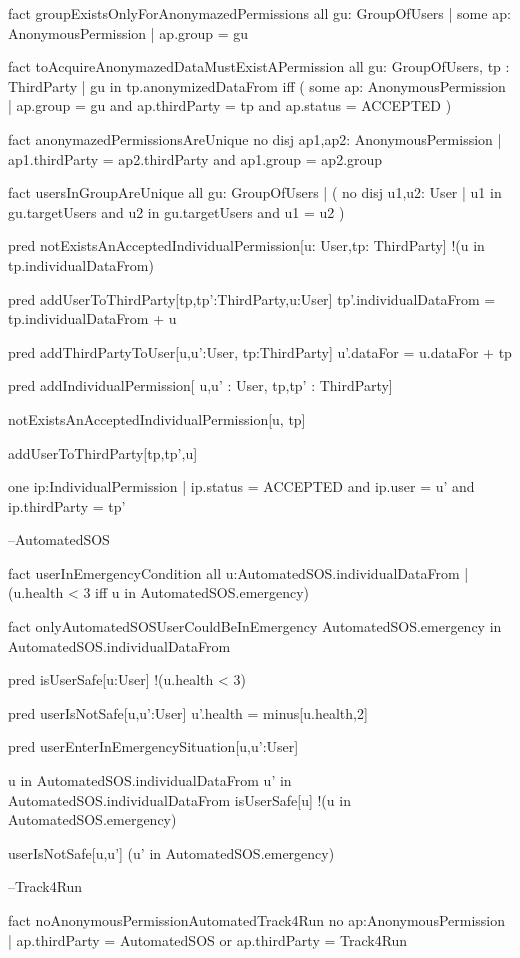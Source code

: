 \documentclass[a4paper]{article}
\begin{document}
{fact groupExistsOnlyForAnonymazedPermissions {
all gu: GroupOfUsers | some ap: AnonymousPermission | ap.group = gu
}

fact toAcquireAnonymazedDataMustExistAPermission{
all gu: GroupOfUsers, tp : ThirdParty |  gu in tp.anonymizedDataFrom iff ( some ap: AnonymousPermission | ap.group = gu and ap.thirdParty = tp and ap.status = ACCEPTED )
}

fact anonymazedPermissionsAreUnique {
no disj ap1,ap2: AnonymousPermission | ap1.thirdParty = ap2.thirdParty and ap1.group = ap2.group
}

fact usersInGroupAreUnique {
all gu: GroupOfUsers | ( no disj u1,u2: User | u1 in gu.targetUsers and u2 in gu.targetUsers and u1 = u2 )
}

pred notExistsAnAcceptedIndividualPermission[u: User,tp: ThirdParty] {
	!(u in tp.individualDataFrom)
}

pred addUserToThirdParty[tp,tp':ThirdParty,u:User] {
	tp'.individualDataFrom = tp.individualDataFrom + u
}

pred addThirdPartyToUser[u,u':User, tp:ThirdParty] {
	u'.dataFor = u.dataFor + tp
}

pred addIndividualPermission[ u,u' : User, tp,tp' : ThirdParty] {

	notExistsAnAcceptedIndividualPermission[u, tp]

	addUserToThirdParty[tp,tp',u]

	one ip:IndividualPermission | ip.status = ACCEPTED and ip.user = u' and ip.thirdParty = tp'
}

--AutomatedSOS

fact userInEmergencyCondition {
	all u:AutomatedSOS.individualDataFrom | (u.health < 3  iff u in AutomatedSOS.emergency) 
}

fact onlyAutomatedSOSUserCouldBeInEmergency {
	AutomatedSOS.emergency in AutomatedSOS.individualDataFrom
}

pred isUserSafe[u:User] {
	!(u.health < 3)
}

pred userIsNotSafe[u,u':User] {
	u'.health = minus[u.health,2]
}

pred userEnterInEmergencySituation[u,u':User] {
	u in AutomatedSOS.individualDataFrom
	u' in AutomatedSOS.individualDataFrom
	isUserSafe[u]
	!(u in AutomatedSOS.emergency)

	userIsNotSafe[u,u']
	(u' in AutomatedSOS.emergency)
}

--Track4Run

fact noAnonymousPermissionAutomatedTrack4Run{
	no ap:AnonymousPermission | ap.thirdParty = AutomatedSOS or ap.thirdParty = Track4Run 
}

}
\end{document}
